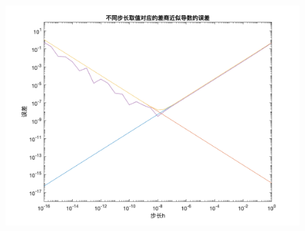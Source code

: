 \documentclass[12pt, utf8, hyperref]{article}
\begin{document}
\lipsum[4]
\begin{figure}[H]
	\centering
	\includegraphics[scale=0.3]{photos/fig.png}
\end{figure}
\end{document}
